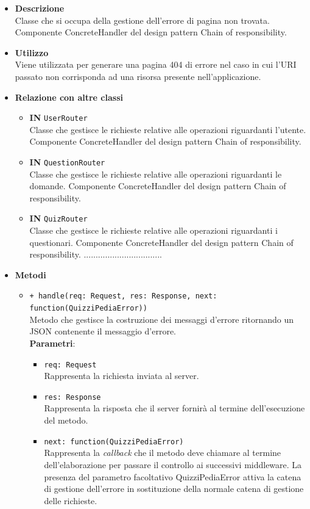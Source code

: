 \begin{itemize}
	\item \textbf{Descrizione}\\
	Classe che si occupa della gestione dell'errore di pagina non trovata. Componente ConcreteHandler del design pattern Chain of responsibility.
	\item \textbf{Utilizzo}\\
	Viene utilizzata per generare una pagina 404 di errore nel caso in cui l'URI passato non corrisponda ad una risorsa presente nell'applicazione.
	\item \textbf{Relazione con altre classi}\\
	\begin{itemize}
		\item \textbf{IN} \texttt{UserRouter}\\
		Classe che gestisce le richieste relative alle operazioni riguardanti l'utente. Componente ConcreteHandler del design pattern Chain of responsibility.
		\item \textbf{IN} \texttt{QuestionRouter}\\
		Classe che gestisce le richieste relative alle operazioni riguardanti le domande. Componente ConcreteHandler del design pattern Chain of responsibility.
		\item \textbf{IN} \texttt{QuizRouter}\\
		Classe che gestisce le richieste relative alle operazioni riguardanti i questionari. Componente ConcreteHandler del design pattern Chain of responsibility.
		.................................
	\end{itemize}
	\item \textbf{Metodi}\\
	\begin{itemize}
		\item \texttt{+ handle(req: Request, res: Response, next: function(QuizziPediaError))}\\
		Metodo che gestisce la costruzione dei messaggi d'errore ritornando un JSON contenente il messaggio d'errore.\\
		\textbf{Parametri}:
		\begin{itemize}
			\item \texttt{req: Request}\\
			Rappresenta la richiesta inviata al server.
			\item \texttt{res: Response}\\
			Rappresenta la risposta che il server fornirà al termine dell'esecuzione del metodo.
			\item \texttt{next: function(QuizziPediaError)}\\
			Rappresenta la \textit{callback} che il metodo deve chiamare al termine dell'elaborazione per passare il controllo ai successivi middleware. La presenza del parametro facoltativo QuizziPediaError attiva la catena di gestione dell'errore in sostituzione della normale catena di gestione delle richieste.
		\end{itemize}
	\end{itemize}
\end{itemize}

